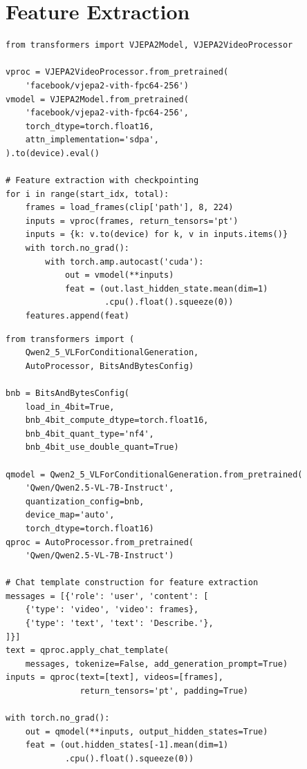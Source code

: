 \section{Feature Extraction}

\begin{lstlisting}[caption={V-JEPA 2 feature extraction with checkpointing.}, label={lst:vjepa_extraction}]
from transformers import VJEPA2Model, VJEPA2VideoProcessor

vproc = VJEPA2VideoProcessor.from_pretrained(
    'facebook/vjepa2-vith-fpc64-256')
vmodel = VJEPA2Model.from_pretrained(
    'facebook/vjepa2-vith-fpc64-256',
    torch_dtype=torch.float16,
    attn_implementation='sdpa',
).to(device).eval()

# Feature extraction with checkpointing
for i in range(start_idx, total):
    frames = load_frames(clip['path'], 8, 224)
    inputs = vproc(frames, return_tensors='pt')
    inputs = {k: v.to(device) for k, v in inputs.items()}
    with torch.no_grad():
        with torch.amp.autocast('cuda'):
            out = vmodel(**inputs)
            feat = (out.last_hidden_state.mean(dim=1)
                    .cpu().float().squeeze(0))
    features.append(feat)
\end{lstlisting}

\begin{lstlisting}[caption={Qwen2.5-VL 4-bit quantized feature extraction.}, label={lst:qwen_extraction}]
from transformers import (
    Qwen2_5_VLForConditionalGeneration,
    AutoProcessor, BitsAndBytesConfig)

bnb = BitsAndBytesConfig(
    load_in_4bit=True,
    bnb_4bit_compute_dtype=torch.float16,
    bnb_4bit_quant_type='nf4',
    bnb_4bit_use_double_quant=True)

qmodel = Qwen2_5_VLForConditionalGeneration.from_pretrained(
    'Qwen/Qwen2.5-VL-7B-Instruct',
    quantization_config=bnb,
    device_map='auto',
    torch_dtype=torch.float16)
qproc = AutoProcessor.from_pretrained(
    'Qwen/Qwen2.5-VL-7B-Instruct')

# Chat template construction for feature extraction
messages = [{'role': 'user', 'content': [
    {'type': 'video', 'video': frames},
    {'type': 'text', 'text': 'Describe.'},
]}]
text = qproc.apply_chat_template(
    messages, tokenize=False, add_generation_prompt=True)
inputs = qproc(text=[text], videos=[frames],
               return_tensors='pt', padding=True)

with torch.no_grad():
    out = qmodel(**inputs, output_hidden_states=True)
    feat = (out.hidden_states[-1].mean(dim=1)
            .cpu().float().squeeze(0))
\end{lstlisting}

